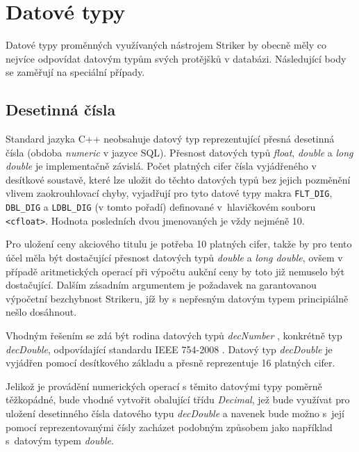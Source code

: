 \documentclass[thesis=M,czech]{FITthesis}[2012/06/26]
\begin{document}

\section{Datové typy}

Datové typy proměnných využívaných nástrojem Striker by obecně měly co nejvíce odpovídat datovým typům svých protějšků 
v databázi. Následující body se zaměřují na speciální případy.


\subsection{Desetinná čísla}

Standard jazyka C++ neobsahuje datový typ reprezentující přesná desetinná čísla (obdoba \textit{numeric} v jazyce SQL). 
Přesnost datových typů \textit{float}, \textit{double} a \textit{long double} je implementačně závislá. Počet platných cifer 
čísla vyjádřeného v desítkové soustavě, které lze uložit do těchto datových typů bez jejich pozměnění vlivem zaokrouhlovací 
chyby, vyjadřují pro tyto datové typy makra \texttt{FLT\_DIG}, \texttt{DBL\_DIG} a \texttt{LDBL\_DIG} (v tomto pořadí) 
definované v~hlavičkovém souboru \texttt{<cfloat>}. Hodnota posledních dvou jmenovaných je vždy nejméně 10. \cite{cppnut}

Pro uložení ceny akciového titulu je potřeba 10 platných cifer, takže by pro tento účel měla být dostačující přesnost datových 
typů \textit{double} a \textit{long double}, ovšem v případě aritmetických operací při výpočtu aukční ceny by toto již nemuselo 
být dostačující. Dalším zásadním argumentem je požadavek na garantovanou výpočetní bezchybnost Strikeru, jíž by s nepřesným 
datovým typem principiálně nešlo dosáhnout.

Vhodným řešením se zdá být rodina datových typů \textit{decNumber} \cite{speldec}, konkrétně typ \textit{decDouble}, odpovídající standardu
IEEE 754-2008 \cite{isodec}. Datový typ \textit{decDouble} je vyjádřen pomocí desítkového základu a přesně reprezentuje 16 platných cifer. 

Jelikož je provádění numerických operací s těmito datovými typy poměrně těžkopádné, bude vhodné vytvořit obalující třídu \textit{Decimal}, jež 
bude využívat pro uložení desetinného čísla datového typu \textit{decDouble} a navenek bude možno s~její pomocí reprezentovanými čísly 
zacházet podobným způsobem jako například s~datovým typem \textit{double}.
\end{document}
